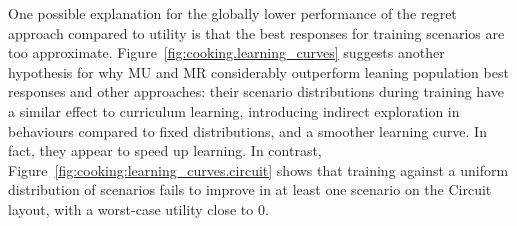 One possible explanation for the globally lower performance of the regret approach compared to utility is that the best responses for training scenarios are too approximate. Figure~\ref{fig:cooking.learning_curves} suggests another hypothesis for why MU and MR considerably outperform leaning population best responses and other approaches: their scenario distributions during training have a similar effect to curriculum learning, introducing indirect exploration in behaviours compared to fixed distributions, and a smoother learning curve. In fact, they appear to speed up learning. In contrast, Figure~\ref{fig:cooking:learning_curves.circuit} shows that training against a uniform distribution of scenarios fails to improve in at least one scenario on the Circuit layout, with a worst-case utility close to 0. 


